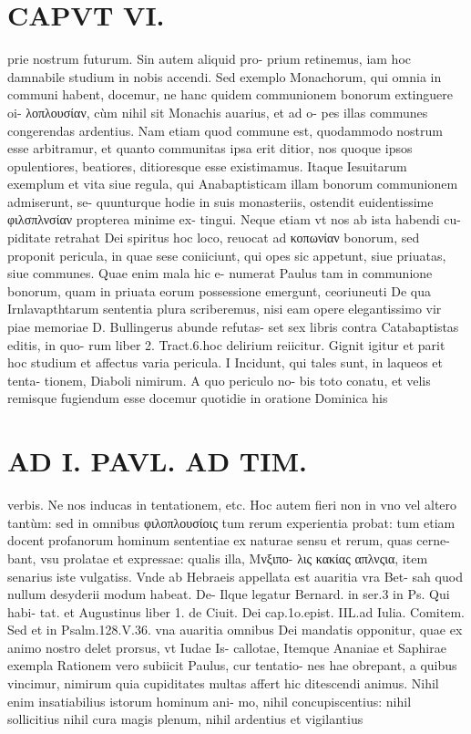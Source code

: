 \documentclass{article}
\begin{document}
\begin{pages}
\section*{CAPVT  VI. }
\marginpar{[ p.449 ]}\pstart prie nostrum futurum. Sin autem aliquid pro- prium retinemus, iam hoc damnabile studium in nobis accendi. Sed exemplo Monachorum, qui omnia in communi habent, docemur, ne hanc quidem communionem bonorum extinguere oi- λοπλουσίαν, cùm nihil sit Monachis auarius, et ad o- pes illas communes congerendas ardentius. Nam etiam quod commune est, quodammodo nostrum esse arbitramur, et quanto communitas ipsa erit ditior, nos quoque  ipsos opulentiores, beatiores, ditioresque esse existimamus. Itaque Iesuitarum exemplum et vita siue regula, qui Anabaptisticam illam bonorum communionem admiserunt, se- quunturque hodie in suis monasteriis, ostendit euidentissime φιλσπλνσίαν propterea minime ex- tingui. Neque etiam vt nos ab ista habendi cu- piditate retrahat Dei spiritus hoc loco, reuocat ad κοπωνίαν bonorum, sed proponit pericula, in quae sese coniiciunt, qui opes sic appetunt, siue priuatas, siue communes. Quae enim mala hic e- numerat Paulus tam in communione bonorum, quam in priuata eorum possessione emergunt, ceoriuneuti De qua Irnlavapthtarum sententia plura scriberemus, nisi eam opere elegantissimo vir piae memoriae D. Bullingerus abunde refutas- set sex libris contra Catabaptistas editis, in quo- rum liber 2. Tract.6.hoc delirium reiicitur.  \pend\pstart Gignit igitur et parit hoc studium et affectus varia pericula.  \pend\pstart I Incidunt, qui tales sunt, in laqueos et tenta- tionem, Diaboli nimirum. A quo periculo no- bis toto conatu, et velis remisque fugiendum esse docemur quotidie in oratione Dominica his  \pend
\section*{AD I. PAVL. AD TIM. }
\marginpar{[ p.450 ]}\pstart verbis. Ne nos inducas in tentationem, etc. Hoc autem fieri non in vno vel altero tantùm: sed in omnibus φιλοπλουσίοις tum rerum experientia probat: tum etiam docent profanorum hominum sententiae ex naturae sensu et rerum, quas cerne- bant, vsu prolatae et expressae: qualis illa, Μνξιπο- λις κακίας απλνςια, item senarius iste vulgatiss.  \pend\pstart Vnde ab Hebraeis appellata est auaritia vra Bet- sah quod nullum desyderii modum habeat. De- Ilque legatur Bernard. in ser.3 in Ps. Qui habi- tat. et Augustinus liber 1. de Ciuit. Dei cap.1o.epist. IIL.ad Iulia. Comitem. Sed et in Psalm.128.V.36. vna auaritia omnibus Dei mandatis opponitur, quae ex animo nostro delet prorsus, vt Iudae Is- callotae, Itemque Ananiae et Saphirae exempla  \pend\pstart Rationem vero subiicit Paulus, cur tentatio- nes hae obrepant, a quibus vincimur, nimirum quia cupiditates multas affert hic ditescendi animus. Nihil enim insatiabilius istorum hominum ani- mo, nihil concupiscentius: nihil sollicitius nihil cura magis plenum, nihil ardentius et vigilantius  \pend

\end{pages}
\end{document}
